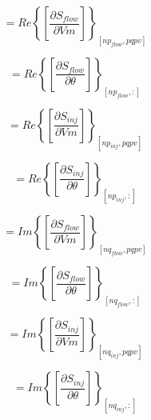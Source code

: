 \documentclass[nols,a4paper,twoside,symmetric,notoc,fleqn]{tufte-book}
\begin{document}
\begin{equation}
[A1] = Re \left\{  \left[  \frac{\partial S_{flow}}{\partial Vm} \right] \right\}_{[np_{flow}, pqpv]}
\end{equation}

\begin{equation}
[A2] = Re \left\{ \left[  \frac{\partial S_{flow}}{\partial \theta} \right] \right\}_{[np_{flow}, :]}
\end{equation}

\begin{equation}
[B1] = Re \left\{ \left[  \frac{\partial S_{inj}}{\partial Vm} \right] \right\}_{[np_{inj}, pqpv]}
\end{equation}


\begin{equation}
[B2] = Re \left\{ \left[   \frac{\partial S_{inj}}{\partial \theta} \right] \right\}_{[np_{inj}, :]}
\end{equation}


\begin{equation}
[C1] = Im\left\{  \left[   \frac{\partial S_{flow}}{\partial Vm}  \right]  \right\}_{[nq_{flow}, pqpv]}
\end{equation}


\begin{equation}
[C2] = Im\left\{ \left[  \frac{\partial S_{flow}}{\partial \theta}  \right] \right\}_{[nq_{flow}, :]}
\end{equation}

\begin{equation}
[D1] = Im\left\{ \left[  \frac{\partial S_{inj}}{\partial Vm}  \right]  \right\}_{[nq_{inj}, pqpv]}
\end{equation}


\begin{equation}
[D2] = Im\left\{ \left[  \frac{\partial S_{inj}}{\partial \theta}   \right] \right\}_{[nq_{inj}, :]}
\end{equation}
\end{document}
